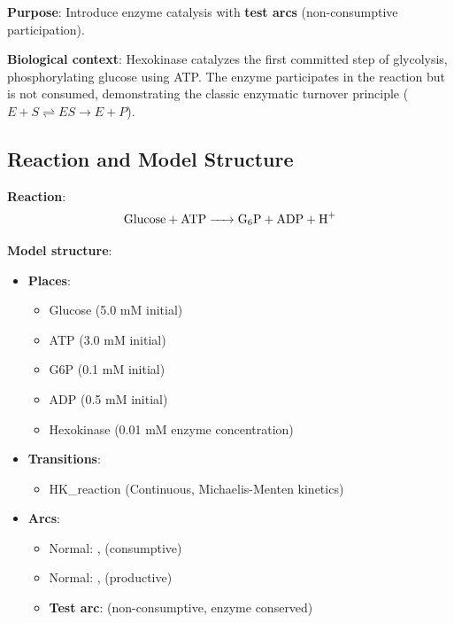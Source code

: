 \textbf{Purpose}: Introduce enzyme catalysis with \textbf{test arcs} (non-consumptive participation).

\textbf{Biological context}: Hexokinase catalyzes the first committed step of glycolysis, phosphorylating glucose using ATP. The enzyme participates in the reaction but is not consumed, demonstrating the classic enzymatic turnover principle ($E + S \rightleftharpoons ES \to E + P$).

\subsection{Reaction and Model Structure}
\label{subsec:hex-structure}

\textbf{Reaction}:
\begin{equation}
\ce{Glucose + ATP -> G6P + ADP + H+}
\end{equation}

\textbf{Model structure}:

\begin{itemize}
    \item \textbf{Places}: 
    \begin{itemize}
        \item Glucose (5.0 mM initial)
        \item ATP (3.0 mM initial)
        \item G6P (0.1 mM initial)
        \item ADP (0.5 mM initial)
        \item Hexokinase (0.01 mM enzyme concentration)
    \end{itemize}
    
    \item \textbf{Transitions}: 
    \begin{itemize}
        \item HK\_reaction (Continuous, Michaelis-Menten kinetics)
    \end{itemize}
    
    \item \textbf{Arcs}:
    \begin{itemize}
        \item Normal: ,  (consumptive)
        \item Normal: ,  (productive)
        \item \textbf{Test arc}:  (non-consumptive, enzyme conserved)
    \end{itemize}
\end{itemize}

